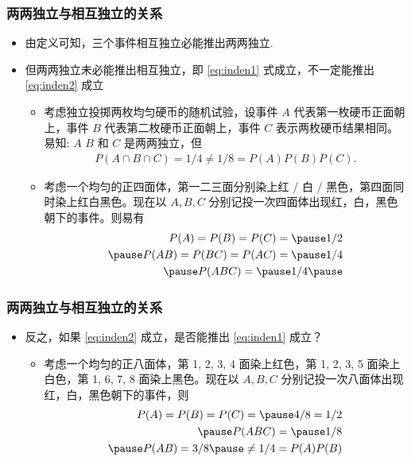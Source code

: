 \begin{frame}
	\frametitle{两两独立与相互独立的关系}
	\begin{itemize}[<+-|alert@+>]
		\item 由定义可知，三个事件相互独立必能推出两两独立.
		\item 但两两独立未必能推出相互独立，即 \eqref{eq:inden1} 式成立，不一定能推出 \eqref{eq:inden2} 成立
		\begin{itemize}
			\item 考虑独立投掷两枚均匀硬币的随机试验，设事件 $A$ 代表第一枚硬币正面朝上，事件 $B$ 代表第二枚硬币正面朝上，事件 $C$ 表示两枚硬币结果相同。易知: \pause
			$A$ $B$ 和 $C$ 是两两独立，但
			\begin{align*}
				P(A\cap B\cap C)=1/4\neq 1/8=P(A)P(B)P(C).
			\end{align*}
			\item 考虑一个均匀的正四面体，第一二三面分别染上红 / 白 / 黑色，第四面同时染上红白黑色。现在以 $A,B,C$ 分别记投一次四面体出现红，白，黑色朝下的事件。则易有 \pause
			\begin{eqnarray*}
				P(A)=P(B)=P(C)=\pause 1/2\\ \pause
				P(AB)=P(BC)=P(AC)=\pause 1/4\\ \pause
				P(ABC)=\pause 1/4    \pause
			\end{eqnarray*}
		\end{itemize}\vspace{-0.7cm}
	\end{itemize}
\end{frame}

		\begin{frame}
			\frametitle{两两独立与相互独立的关系}
			\begin{itemize}[<+-|alert@+>]
		\item 反之，如果 \eqref{eq:inden2} 成立，是否能推出 \eqref{eq:inden1} 成立？
		\begin{itemize}[<+-|alert@+>]
			\item 考虑一个均匀的正八面体，第 1, 2, 3, 4 面染上红色，第 1, 2, 3, 5 面染上白色，第 1, 6, 7, 8 面染上黑色。现在以 $A,B,C$ 分别记投一次八面体出现红，白，黑色朝下的事件，则 \pause
			\begin{eqnarray*}
				P(A)=P(B)=P(C)=\pause 4/8=1/2\\ \pause
				P(ABC)=\pause 1/8   \\ \pause
				P(AB)=3/8\pause \neq 1/4=P(A)P(B)
			\end{eqnarray*}
		\end{itemize}
	\end{itemize}
\end{frame}

